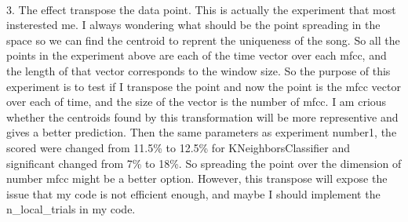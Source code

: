\documentclass[final]{siamltexmm}
\begin{document}
\\ 3. The effect transpose the data point. This is actually the experiment that most insterested me. I always wondering what should be the point spreading in the space so we can find the centroid to reprent the uniqueness of the song. So all the points in the experiment above are each of the time vector over each mfcc, and the length of that vector corresponds to the window size. So the purpose of this experiment is to test if I transpose the point and now the point is the mfcc vector over each of time, and the size of the vector is the number of mfcc. I am crious whether the centroids found by this transformation will be more representive and gives a better prediction. Then the same parameters as experiment number1, the scored were changed from 11.5\% to 12.5\% for KNeighborsClassifier and significant changed from 7\% to 18\%. So spreading the point over the dimension of number mfcc might be a better option. However, this transpose will expose the issue that my code is not efficient enough, and maybe I should implement the n\_local\_trials in my code.
\end{document}
